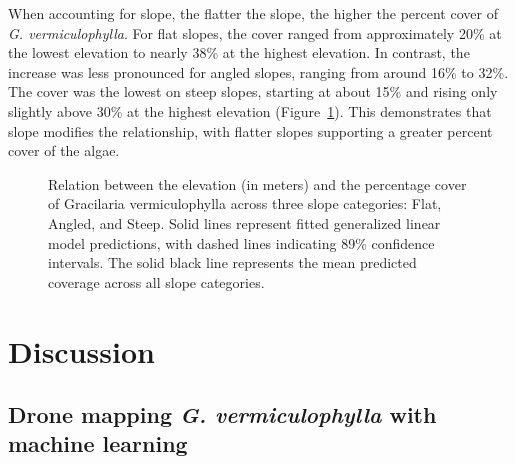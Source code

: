 \documentclass[
  letterpaper,
  11pt,
  english,
  singlespacing,
  headsepline]{MastersDoctoralThesis}
\begin{document}
\begin{spacing}{1.5}
When accounting for slope, the flatter the slope, the higher the percent
cover of \emph{G. vermiculophylla}. For flat slopes, the cover ranged
from approximately 20\% at the lowest elevation to nearly 38\% at the
highest elevation. In contrast, the increase was less pronounced for
angled slopes, ranging from around 16\% to 32\%. The cover was the
lowest on steep slopes, starting at about 15\% and rising only slightly
above 30\% at the highest elevation (Figure~\ref{fig-Gam_Slope}). This
demonstrates that slope modifies the relationship, with flatter slopes
supporting a greater percent cover of the algae.

\begin{figure}


\caption{\label{fig-Gam_Slope}Relation between the elevation (in meters)
and the percentage cover of Gracilaria vermiculophylla across three
slope categories: Flat, Angled, and Steep. Solid lines represent fitted
generalized linear model predictions, with dashed lines indicating 89\%
confidence intervals. The solid black line represents the mean predicted
coverage across all slope categories.}

\end{figure}%

\section{Discussion}\label{discussion-2}

\subsection{\texorpdfstring{Drone mapping \emph{G. vermiculophylla} with
machine
learning}{Drone mapping G. vermiculophylla with machine learning}}\label{drone-mapping-g.-vermiculophylla-with-machine-learning}


\end{spacing}
\end{document}
